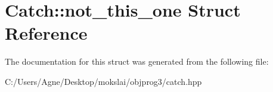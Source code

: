 \hypertarget{struct_catch_1_1not__this__one}{}\section{Catch\+:\+:not\+\_\+this\+\_\+one Struct Reference}
\label{struct_catch_1_1not__this__one}


The documentation for this struct was generated from the following file\+:\begin{DoxyCompactItemize}
\item 
C\+:/\+Users/\+Agne/\+Desktop/mokslai/objprog3/catch.\+hpp\end{DoxyCompactItemize}

